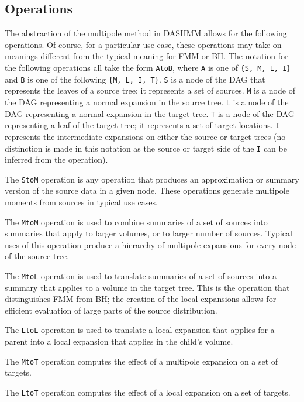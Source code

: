 \subsection{Operations}

The abstraction of the multipole method in DASHMM allows for the following
operations. Of course, for a particular use-case, these operations may take
on meanings different from the typical meaning for FMM or BH. The notation for
the following operations all take the form \texttt{AtoB}, where \texttt{A} is
one of \texttt{\{S, M, L, I\}} and \texttt{B} is one of the
following \texttt{\{M, L, I, T\}}. \texttt{S} is a node of the DAG that
represents the leaves of a source tree; it represents a set of sources.
\texttt{M} is a node of the DAG representing a normal expansion in the source
tree. \texttt{L} is a node of the DAG representing a normal expansion in the
target tree. \texttt{T} is a node of the DAG representing a leaf of the
target tree; it represents a set of target locations. \texttt{I} represents
the intermediate expansions on either the source or target trees (no
distinction is made in this notation as the source or target side of the
\texttt{I} can be inferred from the operation).

The \texttt{StoM} operation is any operation that produces an approximation
or summary version of the source data in a given node. These operations
generate multipole moments from sources in typical use cases.

The \texttt{MtoM} operation is used to combine summaries of a set of sources
into summaries that apply to larger volumes, or to larger number of sources.
Typical uses of this operation produce a hierarchy of multipole expansions
for every node of the source tree.

The \texttt{MtoL} operation is used to translate summaries of a set of sources
into a summary that applies to a volume in the target tree. This is the
operation that distinguishes FMM from BH; the creation of the local expansions
allows for efficient evaluation of large parts of the source distribution.

The \texttt{LtoL} operation is used to translate a local expansion that applies
for a parent into a local expansion that applies in the child's volume.

The \texttt{MtoT} operation computes the effect of a multipole expansion on
a set of targets.

The \texttt{LtoT} operation computes the effect of a local expansion on a
set of targets.

